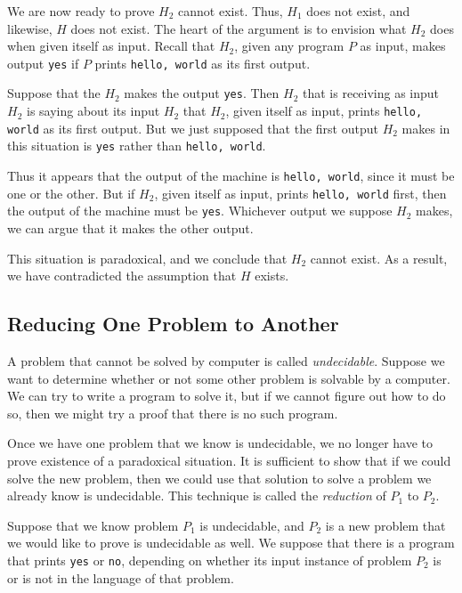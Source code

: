 \documentclass[]{article}
\begin{document}
We are now ready to prove $H_2$ cannot exist. Thus, $H_1$ does not exist,
and likewise, $H$ does not exist. The heart of the argument is to envision
what $H_2$ does when given itself as input. Recall that $H_2$, given any
program $P$ as input, makes output \texttt{yes} if $P$ prints 
\texttt{hello, world} as its first output.

Suppose that the $H_2$ makes the output \texttt{yes}. Then $H_2$ that is 
receiving as input $H_2$ is saying about its input $H_2$ that $H_2$, given
itself as input, prints \texttt{hello, world} as its first output. But we 
just supposed that the first output $H_2$ makes in this situation is 
\texttt{yes} rather than \texttt{hello, world}.

Thus it appears that the output of the machine is \texttt{hello, world},
since it must be one or the other. But if $H_2$, given itself as input,
prints \texttt{hello, world} first, then the output of the machine must be
\texttt{yes}. Whichever output we suppose $H_2$ makes, we can argue that it
makes the other output.

This situation is paradoxical, and we conclude that $H_2$ cannot exist. As 
a result, we have contradicted the assumption that $H$ exists.

\subsection*{Reducing One Problem to Another}
A problem that cannot be solved by computer is called \emph{undecidable}.
Suppose we want to determine whether or not some other problem is solvable
by a computer. We can try to write a program to solve it, but if we cannot
figure out how to do so, then we might try a proof that there is no such
program.

Once we have one problem that we know is undecidable, we no longer have to
prove existence of a paradoxical situation. It is sufficient to show that 
if we could solve the new problem, then we could use that solution to solve 
a problem we already know is undecidable. This technique is called the
\emph{reduction} of $P_1$ to $P_2$.

Suppose that we know problem $P_1$ is undecidable, and $P_2$ is a new
problem that we would like to prove is undecidable as well. We suppose that
there is a program that prints \texttt{yes} or \texttt{no}, depending on 
whether its input instance of problem $P_2$ is or is not in the language of 
that problem.
\end{document}
